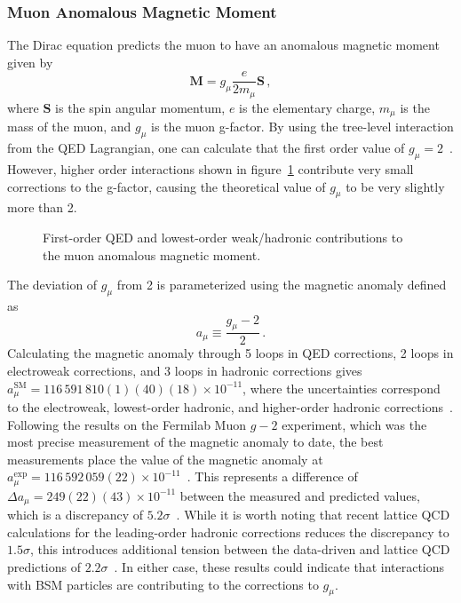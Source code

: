\subsubsection{Muon Anomalous Magnetic Moment} \label{sec:gminus2}
The Dirac equation predicts the muon to have an anomalous magnetic moment given by
\begin{equation}
	\mathbf{M}=g_\mu\frac{e}{2m_\mu}\mathbf{S}\,,
\end{equation}
where $\mathbf{S}$ is the spin angular momentum, $e$ is the elementary charge, $m_\mu$ is the mass of the muon, and $g_\mu$ is the muon g-factor. By using the tree-level interaction from the QED Lagrangian, one can calculate that the first order value of $g_\mu=2$~\cite{gminus2_slides}. However, higher order interactions shown in figure~\ref{fig:muon_magnetic_moment} contribute very small corrections to the g-factor, causing the theoretical value of $g_\mu$ to be very slightly more than 2.
\begin{figure}[htb!]
	\begingroup
	
	
	
	\endgroup
	\caption[First-order QED and lowest-order weak/hadronic contributions to the muon anomalous magnetic moment.]{First-order QED and lowest-order weak/hadronic contributions to the muon anomalous magnetic moment.}
	\label{fig:muon_magnetic_moment}
\end{figure}
The deviation of $g_\mu$ from 2 is parameterized using the magnetic anomaly defined as
\begin{equation}
	a_\mu\equiv\frac{g_\mu-2}{2}\,.
\end{equation}
Calculating the magnetic anomaly through 5 loops in QED corrections, 2 loops in electroweak corrections, and 3 loops in hadronic corrections gives $a_\mu^\text{SM}=116\,591\,810(1)(40)(18)\times10^{-11}$, where the uncertainties correspond to the electroweak, lowest-order hadronic, and higher-order hadronic corrections~\cite{pdg2024}. Following the results on the Fermilab Muon $g-2$ experiment, which was the most precise measurement of the magnetic anomaly to date, the best measurements place the value of the magnetic anomaly at $a_\mu^\text{exp}=116\,592\,059(22)\times10^{-11}$~\cite{gminus2}. This represents a difference of $\Delta a_\mu=249(22)(43)\times10^{-11}$ between the measured and predicted values, which is a discrepancy of $5.2\sigma$~\cite{pdg2024}. While it is worth noting that recent lattice QCD calculations for the leading-order hadronic corrections reduces the discrepancy to $1.5\sigma$, this introduces additional tension between the data-driven and lattice QCD predictions of $2.2\sigma$~\cite{gminus2_latticeqcd}. In either case, these results could indicate that interactions with BSM particles are contributing to the corrections to $g_\mu$.

